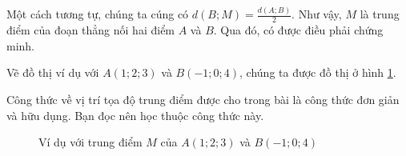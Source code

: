Một cách tương tự, chúng ta cúng có $d(B;M) = \frac{d(A;B)}{2}$. Như vậy, $M$ là trung điểm của đoạn thẳng nối hai điểm $A$ và $B$. Qua đó, có được điều phải chứng minh.

Vẽ đồ thị ví dụ với $A(1;2;3)$ và $B(-1;0;4)$, chúng ta được đồ thị ở hình \ref{fig:trung diem}.

Công thức về vị trí tọa độ trung điểm được cho trong bài là công thức đơn giản và hữu dụng. Bạn đọc nên học thuộc công thức này.

\begin{figure}[H]
   \centering
   \caption{Ví dụ với trung điểm $M$ của $A(1;2;3)$ và $B(-1;0;4)$}
   \label{fig:trung diem}
\end{figure}